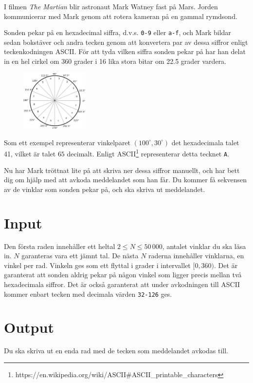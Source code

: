 I filmen \emph{The Martian} blir astronaut Mark Watney fast på Mars. Jorden kommunicerar med Mark genom att rotera
kameran på en gammal rymdsond.

Sonden pekar på en hexadecimal siffra, d.v.s. \texttt{0-9} eller \texttt{a-f}, och Mark bildar sedan bokstäver
och andra tecken genom att konvertera par av dessa siffror enligt teckenkodningen ASCII. För att tyda
vilken siffra sonden pekar på har han delat in en hel cirkel om 360 grader i 16 lika stora bitar om 22.5 grader
vardera.

\begin{figure}[h!]
  \begin{center}
    \includegraphics[width=0.3\textwidth]{angles.eps}
  \end{center}
\end{figure}

Som ett exempel representerar vinkelparet $(100^{\circ}, 30^{\circ})$ det hexadecimala talet 41, vilket är talet $65$ decimalt.
Enligt ASCII\footnote{https://en.wikipedia.org/wiki/ASCII\#ASCII\_printable\_characters} representerar detta tecknet \texttt{A}.

Nu har Mark tröttnat lite på att skriva ner dessa siffror manuellt, och har bett dig om hjälp med att avkoda meddelandet
som han får. Du kommer få sekvensen av de vinklar som sonden pekar på, och ska skriva ut meddelandet.

\section*{Input}
Den första raden innehåller ett heltal $2 \le N \le 50\,000$, antalet vinklar du ska läsa in. $N$ garanteras vara ett jämnt tal.
De nästa $N$ raderna innehåller vinklarna, en vinkel per rad. Vinkeln ges som ett flyttal i grader i intervallet $[0, 360)$.
Det är garanterat att sonden aldrig pekar på någon vinkel som ligger precis mellan två hexadecimala siffror.
Det är också garanterat att under avkodningen till ASCII kommer enbart tecken med decimala värden \texttt{32-126} ges.

\section*{Output}
Du ska skriva ut en enda rad med de tecken som meddelandet avkodas till.

